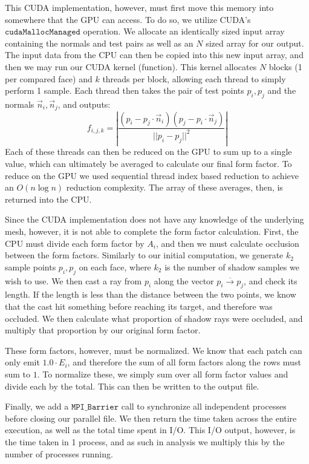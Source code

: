 \documentclass[conference]{IEEEtran}
\begin{document}
This CUDA implementation, however, must first move this memory into somewhere that the GPU can access. To do so, we utilize CUDA's $\texttt{cudaMallocManaged}$ operation. We allocate an identically sized input array containing the normals and test pairs as well as an $N$ sized array for our output. The input data from the CPU can then be copied into this new input array, and then we may run our CUDA kernel (function). This kernel allocates $N$ blocks (1 per compared face) and $k$ threads per block, allowing each thread to simply perform 1 sample. Each thread then takes the pair of test points $p_i, p_j$ and the normals $\vec{n}_i, \vec{n}_j$, and outputs:
\[
f_{i,j,k} = \left|\frac{(p_i-p_j \cdot \vec{n}_i)(p_j-p_i \cdot \vec{n}_j)}{||p_i-p_j||^2}\right|
\]
Each of these threads can then be reduced on the GPU to sum up to a single value, which can ultimately be averaged to calculate our final form factor. To reduce on the GPU we used sequential thread index based reduction to achieve an $O(n\log n)$ reduction complexity. The array of these averages, then, is returned into the CPU. 

Since the CUDA implementation does not have any knowledge of the underlying mesh, however, it is not able to complete the form factor calculation. First, the CPU must divide each form factor by $A_i$, and then we must calculate occlusion between the form factors. Similarly to our initial computation, we generate $k_2$ sample points $p_i, p_j$ on each face, where $k_2$ is the number of shadow samples we wish to use. We then cast a ray from $p_i$ along the vector $\overline{p_i \to p_j}$, and check its length. If the length is less than the distance between the two points, we know that the cast hit something before reaching its target, and therefore was occluded. We then calculate what proportion of shadow rays were occluded, and multiply that proportion by our original form factor.

These form factors, however, must be normalized. We know that each patch can only emit $1.0\cdot E_i$, and therefore the sum of all form factors along the rows must sum to $1$. To normalize these, we simply sum over all form factor values and divide each by the total. This can then be written to the output file.

Finally, we add a $\texttt{MPI\_Barrier}$ call to synchronize all independent processes before closing our parallel file. We then return the time taken across the entire execution, as well as the total time spent in I/O. This I/O output, however, is the time taken in 1 process, and as such in analysis we multiply this by the number of processes running.
\end{document}
